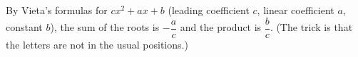 By Vieta's formulas for $cx^2+ax+b$ (leading coefficient $c$, linear coefficient $a$, constant $b$), the sum of the roots is $\boxed{-\dfrac ac}$ and the product is $\boxed{\dfrac bc}$. (The trick is that the letters are not in the usual positions.)
